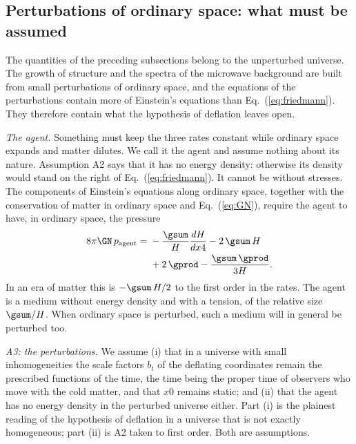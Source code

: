\subsection{Perturbations of ordinary space: what must be assumed}
\label{sec:pert}

The quantities of the preceding subsections belong to the unperturbed universe. The growth of
structure and the spectra of the microwave background are built from small perturbations of
ordinary space, and the equations of the perturbations contain more of Einstein's equations than
Eq.~(\ref{eq:friedmann}). They therefore contain what the hypothesis of deflation leaves open.

\emph{The agent.} Something must keep the three rates constant while ordinary space expands and
matter dilutes. We call it the agent and assume nothing about its nature. Assumption A2 says that it
has no energy density: otherwise its density would stand on the right of Eq.~(\ref{eq:friedmann}).
It cannot be without stresses. The components of Einstein's equations along ordinary space, together
with the conservation of matter in ordinary space and Eq.~(\ref{eq:GN}), require the agent to have,
in ordinary space, the pressure
\begin{equation}
\begin{aligned}
8\pi\GN\,p_{\mathrm{agent}}={}&-\frac{\gsum}{H}\frac{dH}{dx4}-2\,\gsum\,H\\
&+2\,\gprod-\frac{\gsum\,\gprod}{3H}.
\end{aligned}
\label{eq:pagent}
\end{equation}
In an era of matter this is $-\gsum\,H/2$ to the first order in the rates. The agent is a medium
without energy density and with a tension, of the relative size $\gsum/H$. When ordinary space is
perturbed, such a medium will in general be perturbed too.

\emph{A3: the perturbations.} We assume (i) that in a universe with small inhomogeneities the scale
factors $b_t$ of the deflating coordinates remain the prescribed functions of the time, the time
being the proper time of observers who move with the cold matter, and that $x0$ remains static; and
(ii) that the agent has no energy density in the perturbed universe either. Part (i) is the plainest
reading of the hypothesis of deflation in a universe that is not exactly homogeneous; part (ii) is
A2 taken to first order. Both are assumptions.

